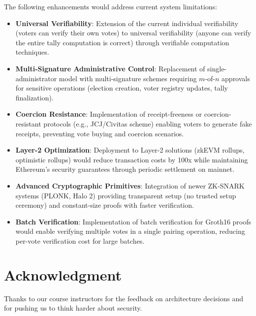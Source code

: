 \documentclass[conference]{IEEEtran}
\begin{document}
The following enhancements would address current system limitations:

\begin{itemize}
    \item \textbf{Universal Verifiability}: Extension of the current individual verifiability (voters can verify their own votes) to universal verifiability (anyone can verify the entire tally computation is correct) through verifiable computation techniques.
    
    \item \textbf{Multi-Signature Administrative Control}: Replacement of single-administrator model with multi-signature schemes requiring $m$-of-$n$ approvals for sensitive operations (election creation, voter registry updates, tally finalization).
    
    \item \textbf{Coercion Resistance}: Implementation of receipt-freeness or coercion-resistant protocols (e.g., JCJ/Civitas scheme) enabling voters to generate fake receipts, preventing vote buying and coercion scenarios.
    
    \item \textbf{Layer-2 Optimization}: Deployment to Layer-2 solutions (zkEVM rollups, optimistic rollups) would reduce transaction costs by 100x while maintaining Ethereum's security guarantees through periodic settlement on mainnet.
    
    \item \textbf{Advanced Cryptographic Primitives}: Integration of newer ZK-SNARK systems (PLONK, Halo 2) providing transparent setup (no trusted setup ceremony) and constant-size proofs with faster verification.
    
    \item \textbf{Batch Verification}: Implementation of batch verification for Groth16 proofs would enable verifying multiple votes in a single pairing operation, reducing per-vote verification cost for large batches.
\end{itemize}

\section*{Acknowledgment}
Thanks to our course instructors for the feedback on architecture decisions and for pushing us to think harder about security.
\end{document}
